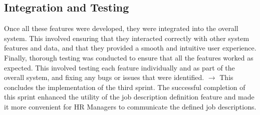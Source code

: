 \subsection{Integration and Testing} 
Once all these features were developed, they were integrated into the overall system. This involved ensuring that they interacted correctly with other system features and data, and that they provided a smooth and intuitive user experience.
Finally, thorough testing was conducted to ensure that all the features worked as expected. This involved testing each feature individually and as part of the overall system, and fixing any bugs or issues that were identified.
$ \rightarrow $ This concludes the implementation of the third sprint. The successful completion of this sprint enhanced the utility of the job description definition feature and made it more convenient for HR Managers to communicate the defined job descriptions.